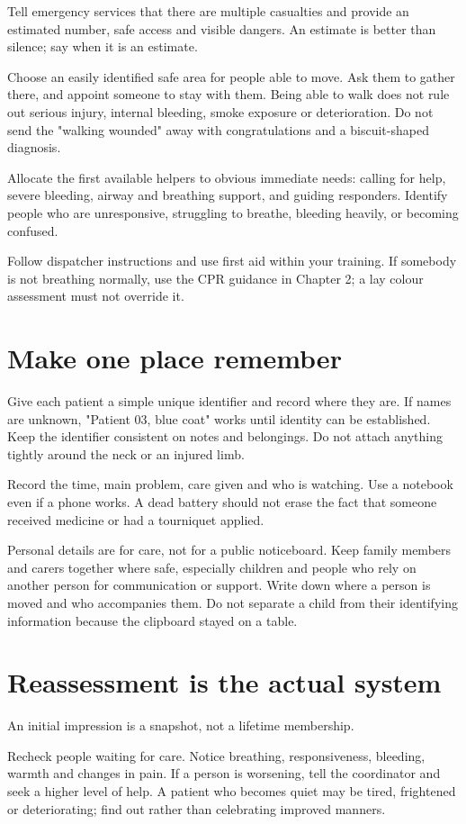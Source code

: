 \documentclass[10pt,openright]{book}
\begin{document}
Tell emergency services that there are multiple casualties and provide an estimated number, safe access and visible dangers. An estimate is better than silence; say when it is an estimate.

Choose an easily identified safe area for people able to move. Ask them to gather there, and appoint someone to stay with them. Being able to walk does not rule out serious injury, internal bleeding, smoke exposure or deterioration. Do not send the "walking wounded" away with congratulations and a biscuit-shaped diagnosis.

Allocate the first available helpers to obvious immediate needs: calling for help, severe bleeding, airway and breathing support, and guiding responders. Identify people who are unresponsive, struggling to breathe, bleeding heavily, or becoming confused.

Follow dispatcher instructions and use first aid within your training. If somebody is not breathing normally, use the CPR guidance in Chapter 2; a lay colour assessment must not override it.

\section*{Make one place remember}
Give each patient a simple unique identifier and record where they are. If names are unknown, "Patient 03, blue coat" works until identity can be established. Keep the identifier consistent on notes and belongings. Do not attach anything tightly around the neck or an injured limb.

Record the time, main problem, care given and who is watching. Use a notebook even if a phone works. A dead battery should not erase the fact that someone received medicine or had a tourniquet applied.

Personal details are for care, not for a public noticeboard. Keep family members and carers together where safe, especially children and people who rely on another person for communication or support. Write down where a person is moved and who accompanies them. Do not separate a child from their identifying information because the clipboard stayed on a table.

\section*{Reassessment is the actual system}
An initial impression is a snapshot, not a lifetime membership.

Recheck people waiting for care. Notice breathing, responsiveness, bleeding, warmth and changes in pain. If a person is worsening, tell the coordinator and seek a higher level of help. A patient who becomes quiet may be tired, frightened or deteriorating; find out rather than celebrating improved manners.
\end{document}
